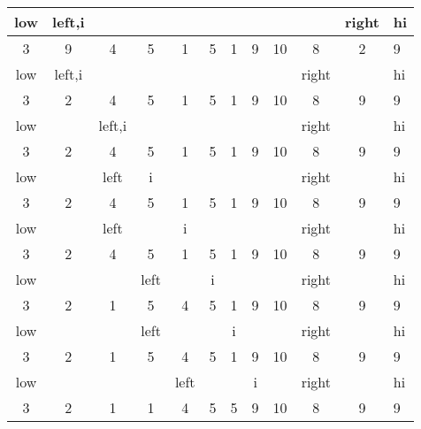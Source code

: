 \documentclass{article}
\begin{document}
\begin{description}
\begin{tabular}{|c|c|c|c|c|c|c|c|c|c|c|l|}\hline
     low&  left,i&        &        &        &        &        &        &        &        &   right&      hi\\\hline
       3&       9&       4&       5&       1&       5&       1&       9&      10&       8&       2&       9\\\hline\hline
     low&  left,i&        &        &        &        &        &        &        &   right&        &      hi\\\hline
       3&       2&       4&       5&       1&       5&       1&       9&      10&       8&       9&       9\\\hline\hline
     low&        &  left,i&        &        &        &        &        &        &   right&        &      hi\\\hline
       3&       2&       4&       5&       1&       5&       1&       9&      10&       8&       9&       9\\\hline\hline
     low&        &    left&       i&        &        &        &        &        &   right&        &      hi\\\hline
       3&       2&       4&       5&       1&       5&       1&       9&      10&       8&       9&       9\\\hline\hline
     low&        &    left&        &       i&        &        &        &        &   right&        &      hi\\\hline
       3&       2&       4&       5&       1&       5&       1&       9&      10&       8&       9&       9\\\hline\hline
     low&        &        &    left&        &       i&        &        &        &   right&        &      hi\\\hline
       3&       2&       1&       5&       4&       5&       1&       9&      10&       8&       9&       9\\\hline\hline
     low&        &        &    left&        &        &       i&        &        &   right&        &      hi\\\hline
       3&       2&       1&       5&       4&       5&       1&       9&      10&       8&       9&       9\\\hline\hline
     low&        &        &        &    left&        &        &       i&        &   right&        &      hi\\\hline
       3&       2&       1&       1&       4&       5&       5&       9&      10&       8&       9&       9\\\hline\hline

\end{tabular}
\end{description}
\end{document}
